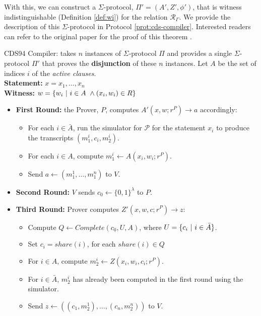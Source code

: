 With this, we can construct a $\Sigma$-protocol, $\Pi' = (A', Z', \phi')$, that is witness indistinguishable (Definition \ref{def:wi}) for the relation $\mathcal R_\Gamma$. We provide the description of this $\Sigma$-protocol in Protocol \ref{prot:cds-compiler}. Interested readers can refer to the original paper for the proof of this theorem \cite{CDS94}. 

\begin{protocol}[label={prot:cds-compiler}]{CDS94 Compiler: takes $n$ instances of 
    $\Sigma$-protocol $\Pi$ and provides a single $\Sigma$-protocol $\Pi'$ that proves the \textbf{disjunction} of these $n$ instances.}
    Let $A$ be the set of indices $i$ of the \textit{active clauses}. \\
    \textbf{Statement:} $x = x_1,\ldots, x_n$ \\
    \textbf{Witness:} $w = \{w_i\ \vert\  i \in A\ \land (x_i, w_i) \in R\}$
    \begin{itemize}
        \item \textbf{First Round:} the Prover, $P$, computes $A'(x,w; r^P) \rightarrow a$ accordingly:
        \begin{itemize}
            \item For each $i \in \bar A$, run the simulator for $\mathcal P$ for the statement $x_i$ to produce the transcripts $(m_1^i, c_i, m_2^i)$.
            \item For each $i \in A$, compute $m_1^i \leftarrow A(x_i, w_i; r^P)$.
            \item Send $a \leftarrow (m_1^1, \ldots, m_1^n)$ to $V$.
        \end{itemize}
        \item \textbf{Second Round:} $V$ sends $c_0 \leftarrow \{0,1\}^\lambda$ to $P$. 
        \item \textbf{Third Round:} Prover computes $Z'(x,w,c;r^P) \rightarrow z$:
        \begin{itemize}
            \item Compute $Q \leftarrow Complete(c_0, U, A)$, where $U = \{c_i\ \vert\  i \in \bar A\}$.
            \item Set $c_i = share(i)$, for each $share(i) \in Q$
            \item For $i \in A$, compute $m_2^i \leftarrow Z(x_i, w_i, c_i; r^P)$. 
            \item For $i \in \bar A$, $m_2^i$ has already been computed in the first round using the simulator.
            \item Send $z \leftarrow ((c_1, m_2^1), \ldots, (c_n,m_2^n))$ to $V$.

\end{itemize}
\end{itemize}
\end{protocol}
